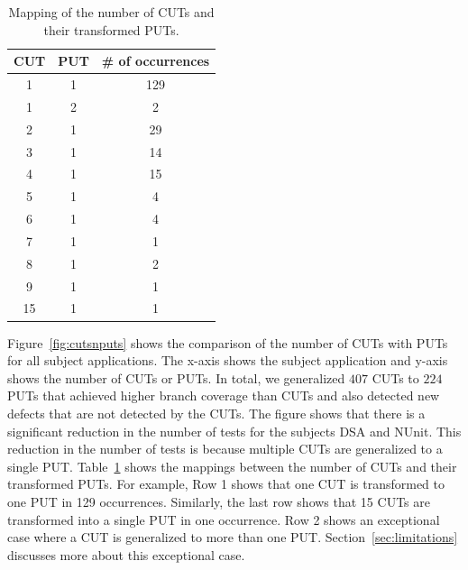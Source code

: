 \begin{table}[t]
\begin{CodeOut}
\begin{center}
\centering 
\begin {tabular} {|c|c|c|}
\hline \textbf{CUT} & \textbf{PUT} & \textbf{\# of occurrences}\\
\hline
\hline 1   & 1   & 129\\
\hline 1   & 2   & 2\\
\hline 2   & 1   & 29\\
\hline 3   & 1   & 14\\
\hline 4   & 1   & 15\\
\hline 5   & 1   & 4\\
\hline 6   & 1   & 4\\
\hline 7   & 1   & 1\\
\hline 8   & 1   & 2\\
\hline 9   & 1   & 1\\
\hline 15   & 1   & 1\\
\hline
\end{tabular}\vspace*{-2ex}
\caption {\label{tab:cutputmapping} Mapping of the number of CUTs and their transformed PUTs.} \vspace*{-4ex}
\end{center}
\end{CodeOut}
\end{table}

Figure~\ref{fig:cutsnputs} shows the comparison of the number of CUTs with PUTs for all subject applications. The x-axis shows the subject application and y-axis shows the number of CUTs or PUTs. In total, we generalized $407$ CUTs to $224$ PUTs that achieved higher branch coverage than CUTs and also detected new defects that are not detected by the CUTs. The figure shows that there is a significant reduction in the number of tests for the subjects DSA and NUnit. This reduction in the number of tests is because multiple CUTs are generalized to a single PUT. Table~\ref{tab:cutputmapping} shows the mappings between the number of CUTs and their transformed PUTs. For example, Row 1 shows that one CUT is transformed to one PUT in 129 occurrences. Similarly, the last row shows that 15 CUTs are transformed into a single PUT in one occurrence. Row 2 shows an exceptional case where a CUT is generalized to more than one PUT. Section~\ref{sec:limitations} discusses more about this exceptional case. 

